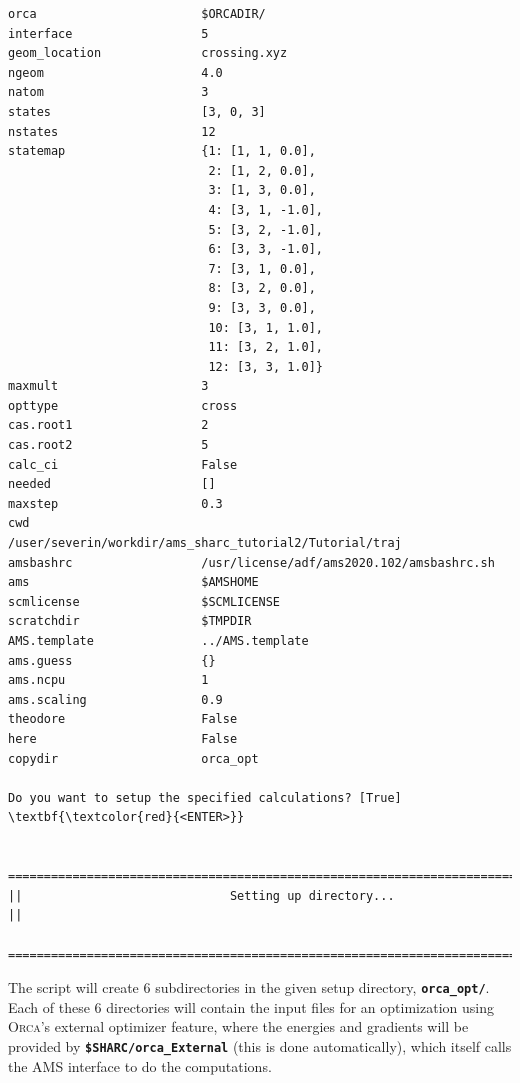 \documentclass[a4paper,11pt,DIV=15,openany]{scrbook}
\newcommand{\ttt}[1]{\textbf{\texttt{#1}}}
\begin{document}
\begin{oframed}
\begin{Verbatim}[commandchars=\\\{\}]
orca                       $ORCADIR/
interface                  5
geom_location              crossing.xyz
ngeom                      4.0
natom                      3
states                     [3, 0, 3]
nstates                    12
statemap                   {1: [1, 1, 0.0], 
                            2: [1, 2, 0.0], 
                            3: [1, 3, 0.0], 
                            4: [3, 1, -1.0], 
                            5: [3, 2, -1.0], 
                            6: [3, 3, -1.0], 
                            7: [3, 1, 0.0], 
                            8: [3, 2, 0.0], 
                            9: [3, 3, 0.0], 
                            10: [3, 1, 1.0], 
                            11: [3, 2, 1.0], 
                            12: [3, 3, 1.0]}
maxmult                    3
opttype                    cross
cas.root1                  2
cas.root2                  5
calc_ci                    False
needed                     []
maxstep                    0.3
cwd                        /user/severin/workdir/ams_sharc_tutorial2/Tutorial/traj
amsbashrc                  /usr/license/adf/ams2020.102/amsbashrc.sh
ams                        $AMSHOME
scmlicense                 $SCMLICENSE
scratchdir                 $TMPDIR
AMS.template               ../AMS.template
ams.guess                  {}
ams.ncpu                   1
ams.scaling                0.9
theodore                   False
here                       False
copydir                    orca_opt

Do you want to setup the specified calculations? [True] \textbf{\textcolor{red}{<ENTER>}}

  ================================================================================
||                             Setting up directory...                            ||
  ================================================================================
\end{Verbatim}
\end{oframed}

\normalsize
The script will create 6 subdirectories in the given setup directory, \ttt{orca\_opt/}.
Each of these 6 directories will contain the input files for an optimization using \textsc{Orca}'s external optimizer feature, where the energies and gradients will be provided by \ttt{\$SHARC/orca\_External} (this is done automatically), which itself calls the \textsc{AMS} interface to do the computations.
\end{document}
